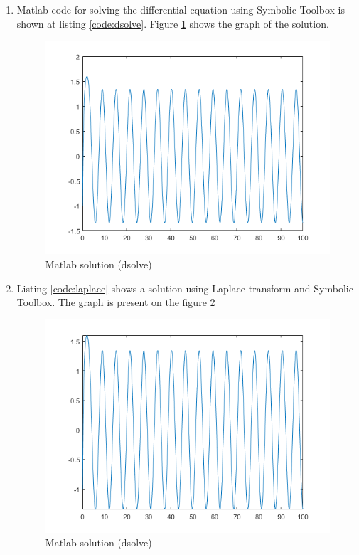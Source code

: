 \documentclass[12pt,letterpaper]{article}
\begin{document}
\begin{enumerate}[leftmargin=!,labelindent=5pt]
    \item Matlab code for solving the differential equation using Symbolic Toolbox is shown at listing \ref{code:dsolve}. Figure \ref{fig:dsolve_out} shows the graph of the solution.
        
    \begin{figure}[H]
            \centering
            \includegraphics[width=15cm]{images/output/ex1_dsolve_out.png}
            \caption{Matlab solution (dsolve)}
            \label{fig:dsolve_out}
        \end{figure}

    \item Listing \ref{code:laplace} shows a solution using Laplace transform and Symbolic Toolbox. The graph is present on the figure \ref{fig:laplace_out}
        
        \begin{figure}[H]
            \centering
            \includegraphics[width=15cm]{images/output/ex1_laplace_out.png}
            \caption{Matlab solution (dsolve)}
            \label{fig:laplace_out}
        \end{figure}
\end{enumerate}
\end{document}
